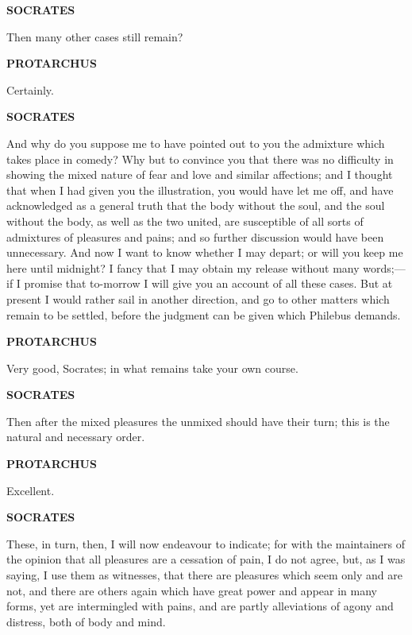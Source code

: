 \documentclass[11pt,letter]{article}
\begin{document}
\par \textbf{SOCRATES}
\par   Then many other cases still remain?

\par \textbf{PROTARCHUS}
\par   Certainly.

\par \textbf{SOCRATES}
\par   And why do you suppose me to have pointed out to you the admixture which takes place in comedy? Why but to convince you that there was no difficulty in showing the mixed nature of fear and love and similar affections; and I thought that when I had given you the illustration, you would have let me off, and have acknowledged as a general truth that the body without the soul, and the soul without the body, as well as the two united, are susceptible of all sorts of admixtures of pleasures and pains; and so further discussion would have been unnecessary. And now I want to know whether I may depart; or will you keep me here until midnight? I fancy that I may obtain my release without many words;—if I promise that to-morrow I will give you an account of all these cases. But at present I would rather sail in another direction, and go to other matters which remain to be settled, before the judgment can be given which Philebus demands.

\par \textbf{PROTARCHUS}
\par   Very good, Socrates; in what remains take your own course.

\par \textbf{SOCRATES}
\par   Then after the mixed pleasures the unmixed should have their turn; this is the natural and necessary order.

\par \textbf{PROTARCHUS}
\par   Excellent.

\par \textbf{SOCRATES}
\par   These, in turn, then, I will now endeavour to indicate; for with the maintainers of the opinion that all pleasures are a cessation of pain, I do not agree, but, as I was saying, I use them as witnesses, that there are pleasures which seem only and are not, and there are others again which have great power and appear in many forms, yet are intermingled with pains, and are partly alleviations of agony and distress, both of body and mind.
\end{document}
